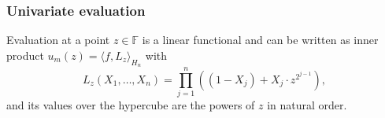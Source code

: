 
\subsubsection{Univariate evaluation}
Evaluation at a point $z\in\mathbb F$ is a linear functional and can be written as inner product $u_m(z) = \langle f, L_z\rangle_{H_n}$ with  
\begin{equation}
\label{e:uni:eval:kernel}
L_z(X_1, \ldots, X_n) = \prod_{j=1}^n \left(
 (1 - X_j) + X_j \cdot z^{2^{j-1}}  \right),
\end{equation}
and its values over the hypercube are the powers of $z$ in natural order.









